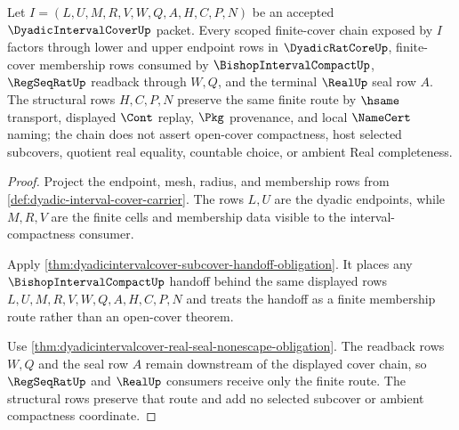 \begin{theorem}
\label{thm:dyadicintervalcover-scoped-finite-cover-chain}
Let $I=(L,U,M,R,V,W,Q,A,H,C,P,N)$ be an accepted $\DyadicIntervalCoverUp$ packet. Every scoped finite-cover chain exposed by $I$ factors through lower and upper endpoint rows in $\DyadicRatCoreUp$, finite-cover membership rows consumed by $\BishopIntervalCompactUp$, $\RegSeqRatUp$ readback through $W,Q$, and the terminal $\RealUp$ seal row $A$. The structural rows $H,C,P,N$ preserve the same finite route by $\hsame$ transport, displayed $\Cont$ replay, $\Pkg$ provenance, and local $\NameCert$ naming; the chain does not assert open-cover compactness, host selected subcovers, quotient real equality, countable choice, or ambient Real completeness.
\end{theorem}
\begin{proof}
Project the endpoint, mesh, radius, and membership rows from \autoref{def:dyadic-interval-cover-carrier}. The rows $L,U$ are the dyadic endpoints, while $M,R,V$ are the finite cells and membership data visible to the interval-compactness consumer.

Apply \autoref{thm:dyadicintervalcover-subcover-handoff-obligation}. It places any $\BishopIntervalCompactUp$ handoff behind the same displayed rows $L,U,M,R,V,W,Q,A,H,C,P,N$ and treats the handoff as a finite membership route rather than an open-cover theorem.

Use \autoref{thm:dyadicintervalcover-real-seal-nonescape-obligation}. The readback rows $W,Q$ and the seal row $A$ remain downstream of the displayed cover chain, so $\RegSeqRatUp$ and $\RealUp$ consumers receive only the finite route. The structural rows preserve that route and add no selected subcover or ambient compactness coordinate.
\end{proof}


